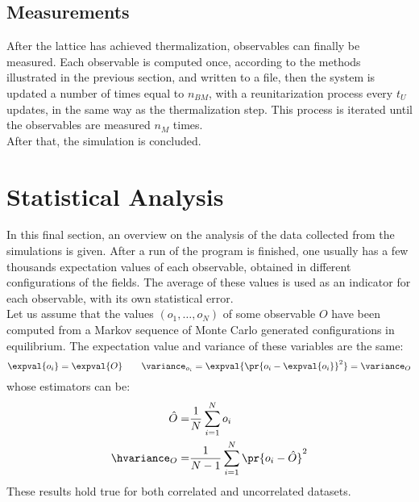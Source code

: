 \subsection{Measurements}
After the lattice has achieved thermalization, observables can finally be measured.
Each observable is computed once, according to the methods illustrated in the previous section, and written to a file, then the system is updated a number of times equal to $n_{BM}$, with a reunitarization process every $t_U$ updates, in the same way as the thermalization step.
This process is iterated until the observables are measured $n_M$ times.\\
After that, the simulation is concluded.

\section{Statistical Analysis}
In this final section, an overview on the analysis of the data collected from the simulations is given.
After a run of the program is finished, one usually has a few thousands expectation values of each observable, obtained in different configurations of the fields.
The average of these values is used as an indicator for each observable, with its own statistical error.\\
Let us assume that the values $(o_1,\dots,o_N)$ of some observable $O$ have been computed from a Markov sequence of Monte Carlo generated configurations in equilibrium.
The expectation value and variance of these variables are the same:
\begin{equation}
    \expval{o_i} = \expval{O} \qquad \variance_{o_i} = \expval{\pr{o_i-\expval{o_i}}^2} = \variance_O
\end{equation}
whose estimators can be:
\begin{align}
    \hat{O} =& \frac1N\sum_{i=1}^N o_i \label{2:ExpVal}\\
    \hvariance_O =& \frac1{N-1}\sum_{i=1}^N\pr{o_i-\hat{O}}^2 \label{2:Variance}
\end{align}
These results hold true for both correlated and uncorrelated datasets.


